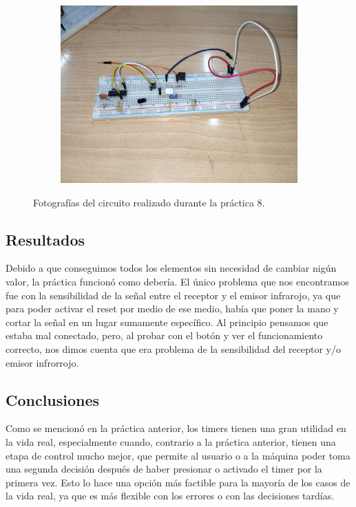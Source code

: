 \begin{figure}[htb]
\begin{subfigure}[htb]{0.45\textwidth}
        \caption{}
    \end{subfigure}
    \centering
    \begin{subfigure}[htb]{0.45\textwidth}
        \centering
        \includegraphics[width=\textwidth]{media/circuito_real_3_08}
        \caption{}
    \end{subfigure}
    \caption{Fotografías del circuito realizado durante la práctica 8.}
    \label{Fig: Fotografias del circuito realizado durante la practica 8}
\end{figure}

\subsection{Resultados}

Debido a que conseguimos todos los elementos sin necesidad de cambiar nigún valor, la práctica funcionó como debería. El único problema que nos encontramos fue con la sensibilidad de la señal entre el receptor y el emisor infrarojo, ya que para poder activar el reset por medio de ese medio, había que poner la mano y cortar la señal en un lugar sumamente específico. Al principio pensamos que estaba mal conectado, pero, al probar con el botón y ver el funcionamiento correcto, nos dimos cuenta que era problema de la sensibilidad del receptor y/o emisor infrorrojo.

\subsection{Conclusiones}

Como se mencionó en la práctica anterior, los timers tienen una gran utilidad en la vida real, especialmente cuando, contrario a la práctica anterior, tienen una etapa de control mucho mejor, que permite al usuario o a la máquina poder toma una segunda decisión después de haber presionar o activado el timer por la primera vez. Esto lo hace una opción más factible para la mayoría de los casos de la vida real, ya que es más flexible con los errores o con las decisiones tardías.

